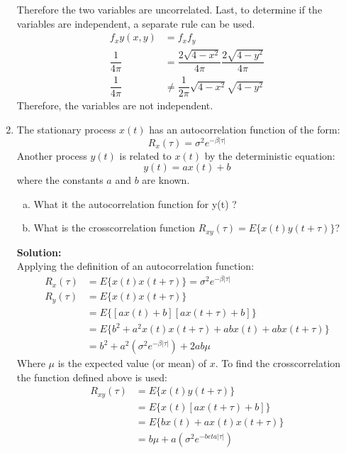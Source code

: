 \documentclass[11pt]{article}
\newcommand{\solution}{\textbf{Solution: \\}}
\begin{document}
\begin{enumerate}[label=\textbf{\arabic*.}]
\begin{equation*}
  \end{equation*}
  Therefore the two variables are uncorrelated. Last, to determine if the 
  variables are independent, a separate rule can be used.
  \begin{equation*}
    \begin{split}
      f_xy(x,y) &= f_xf_y \\
      \dfrac{1}{4\pi} &= \dfrac{2\sqrt{4-x^2}}{4\pi}\dfrac{2\sqrt{4-y^2}}{4\pi} \\
      \dfrac{1}{4\pi} &\neq \dfrac{1}{2\pi} \sqrt{4-x^2}\sqrt{4-y^2}
    \end{split}
  \end{equation*}
  Therefore, the variables are not independent.

  \newpage
  \item The stationary process $x(t)$ has an autocorrelation function of the 
  form:
  \begin{equation*}
    R_x(\tau) = \sigma^2 e^{-\beta |\tau|}
  \end{equation*}
  Another process $y(t)$ is related to $x(t)$ by the deterministic equation: 
  \begin{equation*}
    y(t) = ax(t) + b
  \end{equation*}
  where the constants $a$ and $b$ are known. 
  \begin{enumerate}[(a)]
    \itemsep -2pt
    \item What it the autocorrelation function for y(t) ?
    \item What is the crosscorrelation function $R_{xy}(\tau)=E\{x(t)y(t+\tau)\}$? 
  \end{enumerate}
  \solution
  Applying the definition of an autocorrelation function:
  \begin{equation*}
    \begin{split}
      R_x(\tau) &= E\{x(t)x(t+\tau)\} = \sigma^2 e^{-\beta |\tau|} \\
      R_y(\tau) &= E\{x(t)x(t+\tau)\} \\
      &= E\{[ax(t)+b][ax(t+\tau)+b]\} \\
      &= E\{b^2 + a^2x(t)x(t+\tau) + abx(t) + abx(t+\tau)\} \\
      &= b^2 + a^2\left(\sigma^2 e^{-\beta|\tau|}\right) + 2ab\mu
    \end{split}
  \end{equation*}
  Where $\mu$ is the expected value (or mean) of $x$. To find the 
  crosscorrelation the function defined above is used:
  \begin{equation*}
    \begin{split}
      R_{xy}(\tau) &= E\{x(t)y(t+\tau)\} \\
      &= E\{x(t)[ax(t+\tau)+b]\} \\
      &= E\{bx(t) + ax(t)x(t+\tau)\} \\
      &= b\mu + a\left(\sigma^2 e^{-beta|\tau|}\right)
    \end{split}
  \end{equation*}


\end{enumerate}
\end{document}
